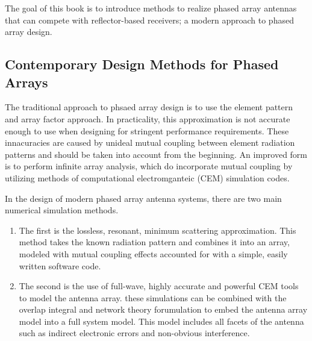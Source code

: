 \documentclass[11pt]{article}
\begin{document}
The goal of this book is to introduce methods to realize phased array antennas that can compete with reflector-based receivers; a modern approach to phased array design.

\subsection{Contemporary Design Methods for Phased Arrays}

The traditional approach to phsaed array design is to use the element pattern and array factor approach. In practicality, this approximation is not accurate enough to use when designing for stringent performance requirements. These innacuracies are caused by unideal mutual coupling between element radiation patterns and should be taken into account from the beginning. An improved form is to perform infinite array analysis, which do incorporate mutual coupling by utilizing methods of computational electromganteic (CEM) simulation codes.

In the design of modern phased array antenna systems, there are two main numerical simulation methods. 

\begin{enumerate}

	\item The first is the lossless, resonant, minimum scattering approximation. This method takes the known radiation pattern and combines it into an array, modeled with mutual coupling effects accounted for with a simple, easily written software code.
	
	\item The second is the use of full-wave, highly accurate and powerful CEM tools to model the antenna array. these simulations can be combined with the overlap integral and network theory forumulation to embed the antenna array model into a full system model. This model includes all facets of the antenna such as indirect electronic errors and non-obvious interference.
\end{enumerate}
\end{document}
